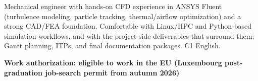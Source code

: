 \begin{cventries}

Mechanical engineer with hands-on CFD experience in ANSYS Fluent (turbulence modeling, particle tracking, thermal/airflow optimization) and a strong CAD/FEA foundation.
Comfortable with Linux/HPC and Python-based simulation workflows, and with the project-side deliverables that surround them: Gantt planning, ITPs, and final documentation packages. C1 English.

\textbf{Work authorization: eligible to work in the EU (Luxembourg post-graduation job-search permit from autumn 2026)}

\end{cventries}
